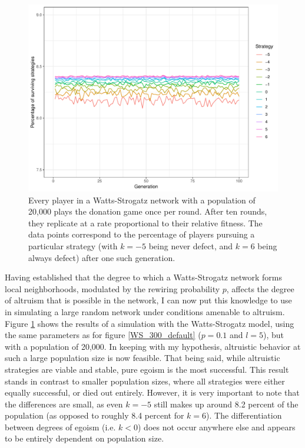 \documentclass[12pt]{article}
\begin{document}
\begin{figure}
    \centering
    \includegraphics[width=\linewidth]{../figures/results_WS_20000_p005.pdf}
    \caption{Every player in a Watts-Strogatz network with a population of 20,000 plays the donation game once per round. After ten rounds, they replicate at a rate proportional to their relative fitness. The data points correspond to the percentage of players pursuing a particular strategy (with $k=-5$ being never defect, and $k=6$ being always defect) after one such generation.}
    \label{WS_20000_default}
\end{figure}

Having established that the degree to which a Watts-Strogatz network forms local neighborhoods, modulated by the rewiring probability $p$, affects the degree of altruism that is possible in the network, I can now put this knowledge to use in simulating a large random network under conditions amenable to altruism. Figure \ref{WS_20000_default} shows the results of a simulation with the Watts-Strogatz model, using the same parameters as for figure \ref{WS_300_default} ($p=0.1$ and $l=5$), but with a population of 20,000. In keeping with my hypothesis, altruistic behavior at such a large population size is now feasible. That being said, while altruistic strategies are viable and stable, pure egoism is the most successful. This result stands in contrast to smaller population sizes, where all strategies were either equally successful, or died out entirely. However, it is very important to note that the differences are small, as even $k=-5$ still makes up around 8.2 percent of the population (as opposed to roughly 8.4 percent for $k=6$). The differentiation between degrees of egoism (i.e. $k<0$) does not occur anywhere else and appears to be entirely dependent on population size.
\end{document}
